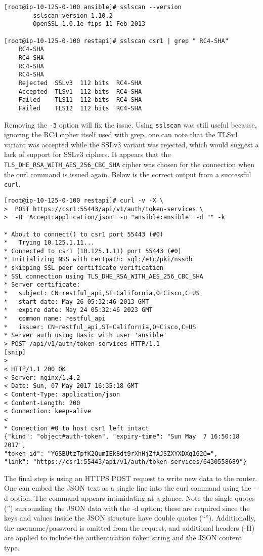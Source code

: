 \begin{verbatim}
[root@ip-10-125-0-100 ansible]# sslscan --version
		sslscan version 1.10.2 
		OpenSSL 1.0.1e-fips 11 Feb 2013

[root@ip-10-125-0-100 restapi]# sslscan csr1 | grep " RC4-SHA"
    RC4-SHA
    RC4-SHA
    RC4-SHA
    RC4-SHA
    Rejected  SSLv3  112 bits  RC4-SHA
    Accepted  TLSv1  112 bits  RC4-SHA
    Failed    TLS11  112 bits  RC4-SHA
    Failed    TLS12  112 bits  RC4-SHA
\end{verbatim}

Removing the \verb|-3| option will fix the issue. Using \verb|sslscan| was still
useful because, ignoring the RC4 cipher itself used with grep, one can note
that the TLSv1 variant was accepted while the SSLv3 variant was rejected,
which would suggest a lack of support for SSLv3 ciphers. It appears that the
\verb|TLS_DHE_RSA_WITH_AES_256_CBC_SHA| cipher was chosen for the connection
when the curl command is issued again. Below is the correct output from a
successful \verb|curl|.

\begin{verbatim}
[root@ip-10-125-0-100 restapi]# curl -v -X \
>  POST https://csr1:55443/api/v1/auth/token-services \
>  -H "Accept:application/json" -u "ansible:ansible" -d "" -k

* About to connect() to csr1 port 55443 (#0)
*   Trying 10.125.1.11...
* Connected to csr1 (10.125.1.11) port 55443 (#0)
* Initializing NSS with certpath: sql:/etc/pki/nssdb
* skipping SSL peer certificate verification
* SSL connection using TLS_DHE_RSA_WITH_AES_256_CBC_SHA
* Server certificate:
* 	subject: CN=restful_api,ST=California,O=Cisco,C=US
* 	start date: May 26 05:32:46 2013 GMT
* 	expire date: May 24 05:32:46 2023 GMT
* 	common name: restful_api
* 	issuer: CN=restful_api,ST=California,O=Cisco,C=US
* Server auth using Basic with user 'ansible'
> POST /api/v1/auth/token-services HTTP/1.1
[snip]
> 
< HTTP/1.1 200 OK
< Server: nginx/1.4.2
< Date: Sun, 07 May 2017 16:35:18 GMT
< Content-Type: application/json
< Content-Length: 200
< Connection: keep-alive
< 
* Connection #0 to host csr1 left intact
{"kind": "object#auth-token", "expiry-time": "Sun May  7 16:50:18 2017",
"token-id": "YGSBUtzTpfK2QumIEk8dt9rXhHjZfAJSZXYXDXg162Q=",
"link": "https://csr1:55443/api/v1/auth/token-services/6430558689"}
\end{verbatim}

The final step is using an HTTPS POST request to write new data to the router.
One can embed the JSON text as a single line into the curl command using the
-d option. The command appears intimidating at a glance. Note the single
quotes ('') surrounding the JSON data with the -d option; these are required
since the keys and values inside the JSON structure have double quotes (``'').
Additionally, the username/password is omitted from the request, and
additional headers (-H) are applied to include the authentication token string and the JSON content type.

